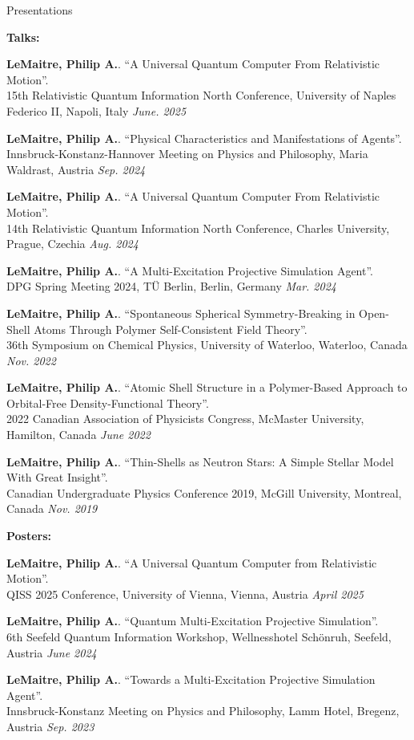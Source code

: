 \documentclass{resume} %
\begin{document}
\begin{rSection}{Presentations}

\textbf{Talks:}

\textbf{LeMaitre, Philip A.}. “A Universal Quantum Computer From Relativistic Motion”. \\
15th Relativistic Quantum Information North Conference, University of Naples Federico II, Napoli, Italy \hfill\textit{{June. 2025}}

\textbf{LeMaitre, Philip A.}. “Physical Characteristics and Manifestations of Agents”. \\
Innsbruck-Konstanz-Hannover Meeting on Physics and Philosophy, Maria Waldrast, Austria \hfill\textit{{Sep. 2024}}

\textbf{LeMaitre, Philip A.}. “A Universal Quantum Computer From Relativistic Motion”. \\
14th Relativistic Quantum Information North Conference, Charles University, Prague, Czechia \hfill\textit{{Aug. 2024}}

\textbf{LeMaitre, Philip A.}. “A Multi-Excitation Projective Simulation Agent”. \\
DPG Spring Meeting 2024, T\"U Berlin, Berlin, Germany \hfill\textit{{Mar. 2024}}

\textbf{LeMaitre, Philip A.}. “Spontaneous Spherical Symmetry-Breaking in Open-Shell Atoms Through Polymer Self-Consistent Field Theory”. \\
36th Symposium on Chemical Physics, University of Waterloo, Waterloo, Canada \hfill\textit{{Nov. 2022}}

\textbf{LeMaitre, Philip A.}. “Atomic Shell Structure in a Polymer-Based Approach to Orbital-Free Density-Functional Theory”. \\
2022 Canadian Association of Physicists Congress, McMaster University, Hamilton, Canada \hfill\textit{{June 2022}}

\textbf{LeMaitre, Philip A.}. “Thin-Shells as Neutron Stars: A Simple Stellar Model With Great Insight”. \\
Canadian Undergraduate Physics Conference 2019, McGill University, Montreal, Canada \hfill\textit{{Nov. 2019}}

\textbf{Posters:}

\textbf{LeMaitre, Philip A.}. “A Universal Quantum Computer from Relativistic Motion”. \\
QISS 2025 Conference, University of Vienna, Vienna, Austria \hfill\textit{{April 2025}}

\textbf{LeMaitre, Philip A.}. “Quantum Multi-Excitation Projective Simulation”. \\
6th Seefeld Quantum Information Workshop, Wellnesshotel Schönruh, Seefeld, Austria \hfill\textit{{June 2024}}

\textbf{LeMaitre, Philip A.}. “Towards a Multi-Excitation Projective Simulation Agent”. \\
Innsbruck-Konstanz Meeting on Physics and Philosophy, Lamm Hotel, Bregenz, Austria \hfill\textit{{Sep. 2023}}

\end{rSection}
\end{document}
